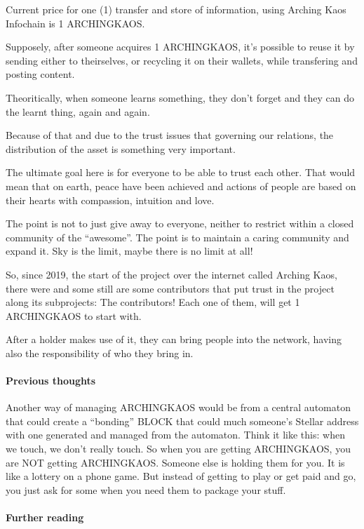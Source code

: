 \documentclass[10pt,a4paper,twocolumn]{paper}
\begin{document}
Current price for one (1) transfer and store of information, using
Arching Kaos Infochain is 1 ARCHINGKAOS.

Supposely, after someone acquires 1 ARCHINGKAOS, it's possible to reuse
it by sending either to theirselves, or recycling it on their wallets,
while transfering and posting content.

Theoritically, when someone learns something, they don't forget and they
can do the learnt thing, again and again.

Because of that and due to the trust issues that governing our
relations, the distribution of the asset is something very important.

The ultimate goal here is for everyone to be able to trust each other.
That would mean that on earth, peace have been achieved and actions of
people are based on their hearts with compassion, intuition and love.

The point is not to just give away to everyone, neither to restrict
within a closed community of the ``awesome''. The point is to maintain a
caring community and expand it. Sky is the limit, maybe there is no
limit at all!

So, since 2019, the start of the project over the internet called
Arching Kaos, there were and some still are some contributors that put
trust in the project along its subprojects: The contributors! Each one
of them, will get 1 ARCHINGKAOS to start with.

After a holder makes use of it, they can bring people into the network,
having also the responsibility of who they bring in.

	\paragraph{Previous thoughts}\label{previous-thoughts}

Another way of managing ARCHINGKAOS would be from a central automaton
that could create a ``bonding'' BLOCK that could much someone's Stellar
address with one generated and managed from the automaton. Think it like
this: when we touch, we don't really touch. So when you are getting
ARCHINGKAOS, you are NOT getting ARCHINGKAOS. Someone else is holding
them for you. It is like a lottery on a phone game. But instead of
getting to play or get paid and go, you just ask for some when you need
them to package your stuff.


	\paragraph{Further reading}\label{further-reading}
\end{document}
